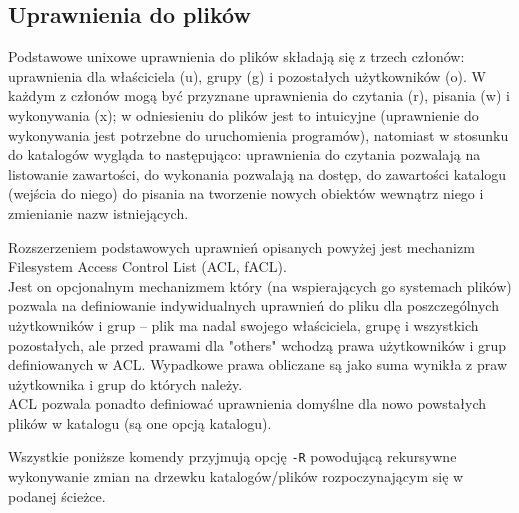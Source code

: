 \documentclass{pdfBooklets}
\begin{document}
\subsection{Uprawnienia do plików}
Podstawowe unixowe uprawnienia do plików składają się z trzech członów: uprawnienia dla właściciela (u), grupy (g) i pozostałych użytkowników (o).
W każdym z członów mogą być przyznane uprawnienia do czytania (r), pisania (w) i wykonywania (x); w odniesieniu do plików jest to intuicyjne (uprawnienie do wykonywania jest potrzebne do uruchomienia programów), natomiast w stosunku do katalogów wygląda to następująco: uprawnienia do czytania pozwalają na listowanie zawartości, do wykonania pozwalają na dostęp, do zawartości katalogu (wejścia do niego) do pisania na tworzenie nowych obiektów wewnątrz niego i zmienianie nazw istniejących.

Rozszerzeniem podstawowych uprawnień opisanych powyżej jest mechanizm Filesystem Access Control List (ACL, fACL).\\
Jest on opcjonalnym mechanizmem który (na wspierających go systemach plików) pozwala na definiowanie indywidualnych uprawnień do pliku dla poszczególnych użytkowników i grup – plik ma nadal swojego właściciela, grupę i wszystkich pozostałych, ale przed prawami dla "others" wchodzą prawa użytkowników i grup definiowanych w ACL. Wypadkowe prawa obliczane są jako suma wynikła z praw użytkownika i grup do których należy.\\
ACL pozwala ponadto definiować uprawnienia domyślne dla nowo powstałych plików w katalogu (są one opcją katalogu).

Wszystkie poniższe komendy przyjmują opcję \texttt{-R} powodującą rekursywne wykonywanie zmian na drzewku katalogów/plików rozpoczynającym się w podanej ścieżce.
\end{document}
